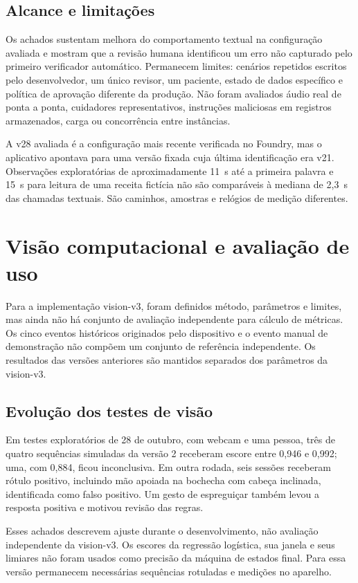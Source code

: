 \subsection{Alcance e limitações}
Os achados sustentam melhora do comportamento textual na configuração avaliada e mostram que a revisão humana identificou um erro não capturado pelo primeiro verificador automático. Permanecem limites: cenários repetidos escritos pelo desenvolvedor, um único revisor, um paciente, estado de dados específico e política de aprovação diferente da produção. Não foram avaliados áudio real de ponta a ponta, cuidadores representativos, instruções maliciosas em registros armazenados, carga ou concorrência entre instâncias.

A v28 avaliada é a configuração mais recente verificada no Foundry, mas o aplicativo apontava para uma versão fixada cuja última identificação era v21. Observações exploratórias de aproximadamente 11~s até a primeira palavra e 15~s para leitura de uma receita fictícia não são comparáveis à mediana de 2,3~s das chamadas textuais. São caminhos, amostras e relógios de medição diferentes.

\section{Visão computacional e avaliação de uso}
Para a implementação vision-v3, foram definidos método, parâmetros e limites, mas ainda não há conjunto de avaliação independente para cálculo de métricas. Os cinco eventos históricos originados pelo dispositivo e o evento manual de demonstração não compõem um conjunto de referência independente. Os resultados das versões anteriores são mantidos separados dos parâmetros da vision-v3.

\subsection{Evolução dos testes de visão}
Em testes exploratórios de 28 de outubro, com webcam e uma pessoa, três de quatro sequências simuladas da versão 2 receberam escore entre 0,946 e 0,992; uma, com 0,884, ficou inconclusiva. Em outra rodada, seis sessões receberam rótulo positivo, incluindo mão apoiada na bochecha com cabeça inclinada, identificada como falso positivo. Um gesto de espreguiçar também levou a resposta positiva e motivou revisão das regras.

Esses achados descrevem ajuste durante o desenvolvimento, não avaliação independente da vision-v3. Os escores da regressão logística, sua janela e seus limiares não foram usados como precisão da máquina de estados final. Para essa versão permanecem necessárias sequências rotuladas e medições no aparelho.

